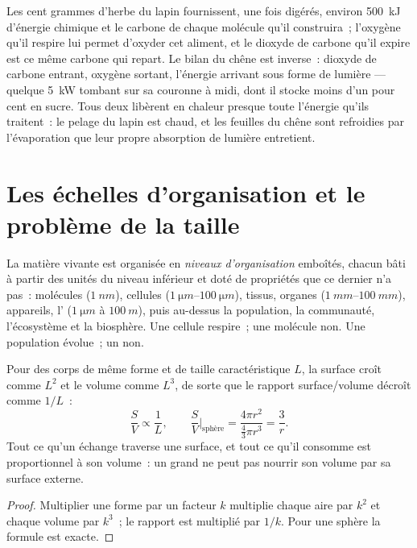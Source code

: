 \begin{example}\label{ex:b1:organism-environment:rabbitoak}
Les cent grammes d'herbe du lapin fournissent, une fois digérés, environ
\qty{500}{kJ} d'énergie chimique et le carbone de chaque molécule qu'il
construira~; l'oxygène qu'il respire lui permet d'oxyder cet aliment, et
le dioxyde de carbone qu'il expire est ce même carbone qui repart. Le
bilan du chêne est inverse~: dioxyde de carbone entrant, oxygène
sortant, l'énergie arrivant sous forme de lumière --- quelque
\qty{5}{kW} tombant sur sa couronne à midi, dont il stocke moins d'un
pour cent en sucre. Tous deux libèrent en chaleur presque toute
l'énergie qu'ils traitent~: le pelage du lapin est chaud, et les
feuilles du chêne sont refroidies par l'évaporation que leur propre
absorption de lumière entretient.
\end{example}

\section{Les échelles d'organisation et le problème de la taille}

\begin{definition}\label{def:b1:organism-environment:levels}
La matière vivante est organisée en \emph{niveaux
d'organisation} emboîtés, chacun bâti à
partir des unités du niveau inférieur et doté de propriétés que ce
dernier n'a pas~: molécules ($\qty{1}{nm}$), cellules
($\qtyrange{1}{100}{\micro m}$), tissus, organes
($\qtyrange{1}{100}{mm}$), appareils, l' ($\qty{1}{\micro m}$ à
$\qty{100}{m}$), puis au-dessus la population, la communauté,
l'écosystème et la biosphère. Une cellule respire~; une molécule non.
Une population évolue~; un  non.
\end{definition}

\begin{proposition}\label{prop:b1:organism-environment:sv}
Pour des corps de même forme et de taille caractéristique $L$, la
surface croît comme $L^2$ et le volume comme $L^3$, de sorte que le
rapport surface/volume décroît comme $1/L$~:
\[
\frac{S}{V} \propto \frac{1}{L}, \qquad
\frac{S}{V}\Big|_{\text{sphère}} = \frac{4\pi r^2}{\tfrac{4}{3}\pi r^3} = \frac{3}{r}.
\]
Tout ce qu'un  échange traverse une surface, et tout ce qu'il
consomme est proportionnel à son volume~: un grand  ne peut pas
nourrir son volume par sa surface externe.
\end{proposition}
\begin{proof}
Multiplier une forme par un facteur $k$ multiplie chaque aire par $k^2$
et chaque volume par $k^3$~; le rapport est multiplié par $1/k$. Pour
une sphère la formule est exacte.
\end{proof}

